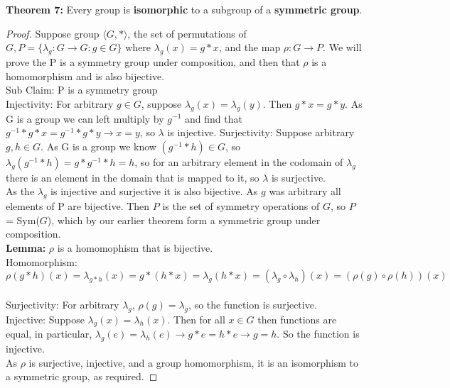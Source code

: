 \documentclass[twoside]{article}
\newcommand{\done}{\renewcommand\qedsymbol{$\blacksquare$}}
\begin{document}
\begin{spacing}{1.25}
\begin{mdframed}[roundcorner=10pt, backgroundcolor=gray!10]
    \textbf{Theorem 7:} Every group is \textbf{isomorphic} to a subgroup of a \textbf{symmetric group}.
\end{mdframed}
\begin{proof}
Suppose group $\langle G, * \rangle$, the set of permutations of $G, P = \{\lambda_g:G \rightarrow G : g \in G\}$ 
where $\lambda_g(x) = g * x$, and the map $\rho:G \rightarrow P$. We will prove the P is a symmetry group under composition, and then that $\rho$ is a homomorphism and is also bijective. \\
Sub Claim: P is a symmetry group \\
Injectivity: For arbitrary $g \in G$, suppose $\lambda_g(x) = \lambda_g(y)$. Then $g * x = g * y$. As G is a group we can
left multiply by $g^{-1}$ and find that $g^{-1} * g * x = g^{-1} * g * y \rightarrow x = y$, so $\lambda$ is injective.
Surjectivity: Suppose arbitrary $g, h \in G$. As G is a group we know $(g^{-1} * h) \in G$, so
$\lambda_g(g^{-1}*h) = g * g^{-1} * h = h$, so for an arbitrary element in the codomain of $\lambda_g$ there is an 
element in the domain that is mapped to it, so $\lambda$ is surjective. \\
As the $\lambda_g$ is injective and surjective it is also bijective. As $g$ was arbitrary all elements of P are
bijective. Then $P$ is the set of symmetry operations of $G$, so $P$ = Sym($G$), which by our earlier theorem form a 
symmetric group under composition. \\
\textbf{Lemma:} $\rho$ is a homomophism that is bijective. \\
Homomorphism: \begin{equation}
    \rho(g * h)(x) = \lambda_{g * h}(x) = g * (h * x) = \lambda_g(h * x) = (\lambda_g \circ \lambda_h)(x) =
    (\rho(g)\circ\rho(h))(x)
\end{equation} \\
Surjectivity: For arbitrary $\lambda_g$, $\rho(g) = \lambda_g$, so the function is surjective. \\
Injective: Suppose $\lambda_g(x) = \lambda_h(x)$. Then for all $x \in G$ then functions are equal, in particular,
$\lambda_g(e) = \lambda_h(e) \rightarrow g*e = h*e \rightarrow g = h$. So the function is injective. \\
As $\rho$ is surjective, injective, and a group homomorphism, it is an isomorphism to a symmetric group,
as required.
\done
\end{proof}


\end{spacing}
\end{document}
